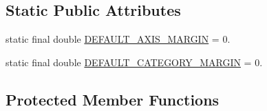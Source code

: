 \subsection*{Static Public Attributes}
\begin{DoxyCompactItemize}
\item 
static final double \mbox{\hyperlink{classorg_1_1jfree_1_1chart_1_1axis_1_1_category_axis_af7748b635d960f8ceaa2cc47b152122e}{D\+E\+F\+A\+U\+L\+T\+\_\+\+A\+X\+I\+S\+\_\+\+M\+A\+R\+G\+IN}} = 0.
\item 
static final double \mbox{\hyperlink{classorg_1_1jfree_1_1chart_1_1axis_1_1_category_axis_a5342c8946735db9c18afc8c17f7a3d55}{D\+E\+F\+A\+U\+L\+T\+\_\+\+C\+A\+T\+E\+G\+O\+R\+Y\+\_\+\+M\+A\+R\+G\+IN}} = 0.
\end{DoxyCompactItemize}
\subsection*{Protected Member Functions}
